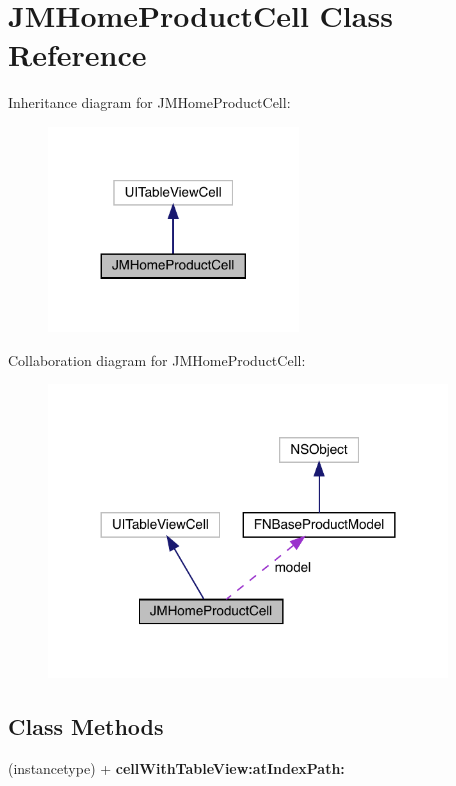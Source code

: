 \hypertarget{interface_j_m_home_product_cell}{}\section{J\+M\+Home\+Product\+Cell Class Reference}
\label{interface_j_m_home_product_cell}


Inheritance diagram for J\+M\+Home\+Product\+Cell\+:\nopagebreak
\begin{figure}[H]
\begin{center}
\leavevmode
\includegraphics[width=188pt]{interface_j_m_home_product_cell__inherit__graph}
\end{center}
\end{figure}


Collaboration diagram for J\+M\+Home\+Product\+Cell\+:\nopagebreak
\begin{figure}[H]
\begin{center}
\leavevmode
\includegraphics[width=300pt]{interface_j_m_home_product_cell__coll__graph}
\end{center}
\end{figure}
\subsection*{Class Methods}
\begin{DoxyCompactItemize}
\item 
\mbox{\label{interface_j_m_home_product_cell_a097db04c02b2e290216ff63dbcf2a12f}} 
(instancetype) + {\bfseries cell\+With\+Table\+View\+:at\+Index\+Path\+:}
\end{DoxyCompactItemize}
